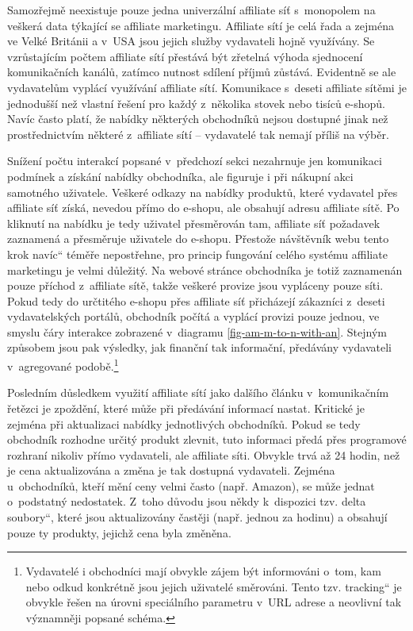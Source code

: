 \documentclass[12pt,twoside,openany]{fithesis}
\begin{document}
Samozřejmě neexistuje pouze jedna univerzální affiliate síť s~monopolem 
na veškerá data týkající se affiliate marketingu. Affiliate sítí je 
celá řada a zejména ve Velké Británii a v~USA jsou jejich služby 
vydavateli hojně využívány. Se vzrůstajícím počtem affiliate sítí 
přestává být zřetelná výhoda sjednocení komunikačních kanálů, 
zatímco nutnost sdílení příjmů zůstává. Evidentně se ale vydavatelům 
vyplácí využívání affiliate sítí. Komunikace s~deseti affiliate 
sítěmi je jednodušší než vlastní řešení pro každý z~několika 
stovek nebo tisíců e-shopů. Navíc často platí, že nabídky některých 
obchodníků nejsou dostupné jinak než prostřednictvím některé 
z~affiliate sítí -- vydavatelé tak nemají příliš na výběr.

Snížení počtu interakcí popsané v~předchozí sekci nezahrnuje jen 
komunikaci podmínek a získání nabídky obchodníka, ale figuruje i při 
nákupní akci samotného uživatele. Veškeré odkazy na nabídky produktů, 
které vydavatel přes affiliate síť získá, nevedou přímo do e-shopu, ale 
obsahují adresu affiliate sítě. Po kliknutí na nabídku je tedy uživatel 
přesměrován tam, affiliate síť požadavek zaznamená a přesměruje 
uživatele do e-shopu. Přestože návštěvník webu tento \glqq krok 
navíc\textquotedblleft{} téměře nepostřehne, pro princip fungování 
celého systému affiliate marketingu je velmi důležitý. Na webové stránce 
obchodníka je totiž zaznamenán pouze příchod z~affiliate sítě, takže 
veškeré provize jsou vypláceny pouze síti. Pokud tedy do určtitého 
e-shopu přes affiliate síť přicházejí zákazníci z~deseti 
vydavatelských portálů, obchodník počítá a vyplácí provizi pouze 
jednou, ve smyslu čáry interakce zobrazené v~diagramu 
\hyperlink{fig-am-m-to-n-with-an}{{\ref{fig-am-m-to-n-with-an}}}. Stejným 
způsobem jsou pak výsledky, jak finanční tak informační, předávány 
vydavateli v~agregované 
podobě.\footnote{
    Vydavatelé i obchodníci mají obvykle zájem být informováni o~tom, kam 
nebo odkud konkrétně jsou jejich uživatelé směrováni. Tento tzv. \glqq 
tracking\textquotedblleft{} je obvykle řešen na úrovni speciálního 
parametru v~URL adrese a neovlivní tak významněji popsané schéma.}

Posledním důsledkem využití affiliate sítí jako dalšího článku 
v~komunikačním řetězci je zpoždění, které může při předávání 
informací nastat. Kritické je zejména při aktualizaci nabídky 
jednotlivých obchodníků. Pokud se tedy obchodník rozhodne určitý produkt 
zlevnit, tuto informaci předá přes programové rozhraní nikoliv přímo 
vydavateli, ale affiliate síti. Obvykle trvá až 24 hodin, než je cena 
aktualizována a změna je tak dostupná vydavateli. Zejména u~obchodníků, 
kteří mění ceny velmi často (např. Amazon), se může jednat o~podstatný 
nedostatek. Z~toho důvodu jsou někdy k~dispozici tzv. \glqq delta 
soubory\textquotedblleft{}, které jsou aktualizovány častěji (např. jednou 
za hodinu) a obsahují pouze ty produkty, jejichž cena byla změněna.
\end{document}
